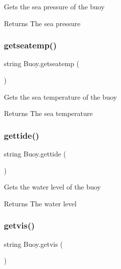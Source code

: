 Gets the sea pressure of the buoy \begin{DoxyReturn}{Returns}
The sea pressure 
\end{DoxyReturn}
\mbox{\label{class_buoy_a72746a5814c47d1d5ec06159cd16fa5e}} 
\subsubsection{\texorpdfstring{getseatemp()}{getseatemp()}}
{\footnotesize\ttfamily string Buoy.\+getseatemp (\begin{DoxyParamCaption}{ }\end{DoxyParamCaption})\hspace{0.3cm}{\ttfamily [inline]}}

Gets the sea temperature of the buoy \begin{DoxyReturn}{Returns}
The sea temperature 
\end{DoxyReturn}
\mbox{\label{class_buoy_a4ce29e4567cf7541f078c806c2022c39}} 
\subsubsection{\texorpdfstring{gettide()}{gettide()}}
{\footnotesize\ttfamily string Buoy.\+gettide (\begin{DoxyParamCaption}{ }\end{DoxyParamCaption})\hspace{0.3cm}{\ttfamily [inline]}}

Gets the water level of the buoy \begin{DoxyReturn}{Returns}
The water level 
\end{DoxyReturn}
\mbox{\label{class_buoy_a8688ad14f6a063e07f16e6528f7c759e}} 
\subsubsection{\texorpdfstring{getvis()}{getvis()}}
{\footnotesize\ttfamily string Buoy.\+getvis (\begin{DoxyParamCaption}{ }\end{DoxyParamCaption})\hspace{0.3cm}{\ttfamily [inline]}}


